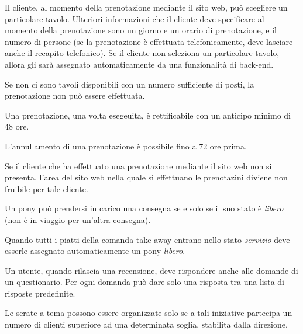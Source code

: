 \begin{enumbusinessrules}
\item Il cliente, al momento della prenotazione mediante il sito web, può scegliere un particolare tavolo. Ulteriori informazioni che il cliente deve specificare al momento della prenotazione sono un giorno e un orario di prenotazione, e il numero di persone (se la prenotazione è effettuata telefonicamente, deve lasciare anche il recapito telefonico). Se il cliente non seleziona un particolare tavolo, allora gli sarà assegnato automaticamente da una funzionalità di back-end.
\item Se non ci sono tavoli disponibili con un numero sufficiente di posti, la prenotazione non può essere effettuata.
\item Una prenotazione, una volta esegeuita, è rettificabile con un anticipo minimo di 48 ore.
\item L'annullamento di una prenotazione è possibile fino a 72 ore prima.
\item Se il cliente che ha effettuato una prenotazione mediante il sito web non si presenta, l'area del sito web nella quale si effettuano le prenotazini diviene non fruibile per tale cliente.
\item Un pony può prendersi in carico una consegna se e solo se il suo stato è {\it libero} (non è in viaggio per un'altra consegna).
\item Quando tutti i piatti della comanda take-away entrano nello stato {\it servizio} deve esserle assegnato automaticamente un pony {\it libero}.
\item\label{br.surveyanswers} Un utente, quando rilascia una recensione, deve rispondere anche alle domande di un questionario. Per ogni domanda può dare solo una risposta tra una lista di risposte predefinite.
\item Le serate a tema possono essere organizzate solo se a tali iniziative partecipa un numero di clienti superiore ad una determinata soglia, stabilita dalla direzione.
\end{enumbusinessrules}
